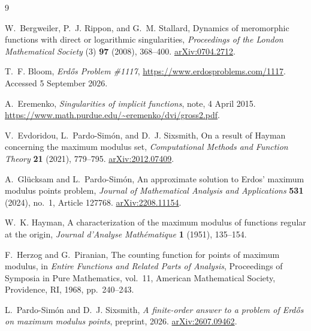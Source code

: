 \documentclass[11pt]{article}
\theoremstyle{remark}
\numberwithin{equation}{section}
\begin{document}
\begin{thebibliography}{9}

W.~Bergweiler, P.~J. Rippon, and G.~M. Stallard,
Dynamics of meromorphic functions with direct or logarithmic
singularities,
\emph{Proceedings of the London Mathematical Society} (3)
\textbf{97} (2008), 368--400.
\href{https://arxiv.org/abs/0704.2712}{arXiv:0704.2712}.

T.~F. Bloom,
\emph{Erd\H{o}s Problem \#1117},
\url{https://www.erdosproblems.com/1117}.
Accessed 5 September 2026.

A.~Eremenko,
\emph{Singularities of implicit functions},
note, 4 April 2015.
\url{https://www.math.purdue.edu/~eremenko/dvi/gross2.pdf}.

V.~Evdoridou, L.~Pardo-Sim\'on, and D.~J. Sixsmith,
On a result of Hayman concerning the maximum modulus set,
\emph{Computational Methods and Function Theory} \textbf{21} (2021),
779--795.
\href{https://arxiv.org/abs/2012.07409}{arXiv:2012.07409}.

A.~Gl\"ucksam and L.~Pardo-Sim\'on,
An approximate solution to Erdos' maximum modulus points problem,
\emph{Journal of Mathematical Analysis and Applications}
\textbf{531} (2024), no.~1, Article 127768.
\href{https://arxiv.org/abs/2208.11154}{arXiv:2208.11154}.

W.~K. Hayman,
A characterization of the maximum modulus of functions regular at the origin,
\emph{Journal d'Analyse Math\'ematique} \textbf{1} (1951), 135--154.

F.~Herzog and G.~Piranian,
The counting function for points of maximum modulus,
in \emph{Entire Functions and Related Parts of Analysis},
Proceedings of Symposia in Pure Mathematics, vol.~11,
American Mathematical Society, Providence, RI, 1968, pp.~240--243.

L.~Pardo-Sim\'on and D.~J. Sixsmith,
\emph{A finite-order answer to a problem of Erd\H{o}s on maximum
modulus points},
preprint, 2026.
\href{https://arxiv.org/abs/2607.09462}{arXiv:2607.09462}.

\end{thebibliography}
\end{document}
